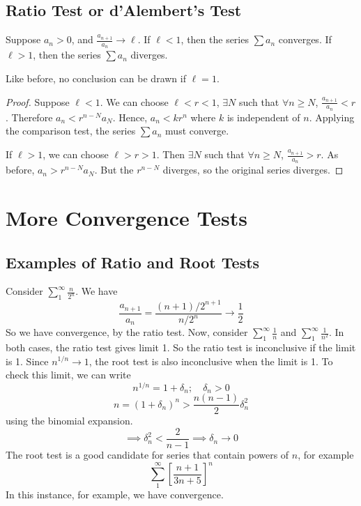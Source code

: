 \documentclass{article}
\begin{document}
\subsection{Ratio Test or d'Alembert's Test}
\begin{theorem}
	Suppose $a_n > 0$, and $\frac{a_{n+1}}{a_n} \to \ell$. If $\ell < 1$, then the series $\sum a_n$ converges. If $\ell > 1$, then the series $\sum a_n$ diverges.
\end{theorem}
\begin{remark}
	Like before, no conclusion can be drawn if $\ell = 1$.
\end{remark}
\begin{proof}
	Suppose $\ell < 1$. We can choose $\ell < r < 1$, $\exists N$ such that $\forall n \geq N$, $\frac{a_{n+1}}{a_n} < r$. Therefore $a_n < r^{n-N} a_N$. Hence, $a_n < k r^n$ where $k$ is independent of $n$. Applying the comparison test, the series $\sum a_n$ must converge.

	If $\ell > 1$, we can choose $\ell > r > 1$. Then $\exists N$ such that $\forall n \geq N$, $\frac{a_{n+1}}{a_n} > r$. As before, $a_n > r^{n-N} a_N$. But the $r^{n-N}$ diverges, so the original series diverges.
\end{proof}

\section{More Convergence Tests}
\subsection{Examples of Ratio and Root Tests}
Consider $\sum_1^\infty \frac{n}{2^n}$. We have
\[ \frac{a_{n+1}}{a_n} = \frac{(n+1)/2^{n+1}}{n/2^n} \to \frac{1}{2} \]
So we have convergence, by the ratio test. Now, consider $\sum_1^\infty \frac{1}{n}$ and $\sum_1^\infty \frac{1}{n^2}$. In both cases, the ratio test gives limit 1. So the ratio test is inconclusive if the limit is 1. Since $n^{1/n} \to 1$, the root test is also inconclusive when the limit is 1. To check this limit, we can write
\[ n^{1/n} = 1 + \delta_n;\quad \delta_n > 0 \]
\[ n = (1 + \delta_n)^n > \frac{n(n-1)}{2}\delta_n^2 \]
using the binomial expansion.
\[ \implies \delta_n^2 < \frac{2}{n-1} \implies \delta_n \to 0 \]
The root test is a good candidate for series that contain powers of $n$, for example
\[ \sum_1^\infty \left[ \frac{n+1}{3n+5} \right]^n \]
In this instance, for example, we have convergence.
\end{document}
